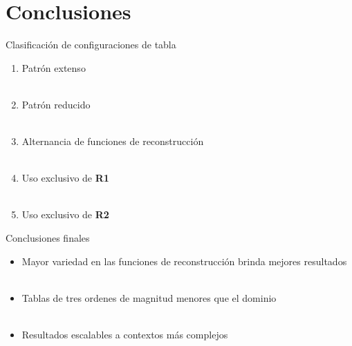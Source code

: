 \documentclass{beamer}
\begin{document}
\section{Conclusiones}

\begin{frame}{Clasificación de configuraciones de tabla}
	\begin{enumerate}

		\item Patrón extenso\\
		~\\
		\item Patrón reducido\\
		~\\
		\item Alternancia de funciones de reconstrucción\\
		~\\
		\item Uso exclusivo de \textbf{R1}\\
		~\\
		\item Uso exclusivo de \textbf{R2}\\

	\end{enumerate}
\end{frame}

%
%

\begin{frame}{Conclusiones finales}
	\begin{itemize}

		\item Mayor variedad en las funciones de reconstrucción brinda mejores resultados\\
		~\\
		\item Tablas de tres ordenes de magnitud menores que el dominio\\
		~\\
		\item Resultados escalables a contextos más complejos

	\end{itemize}
\end{frame}
\end{document}
